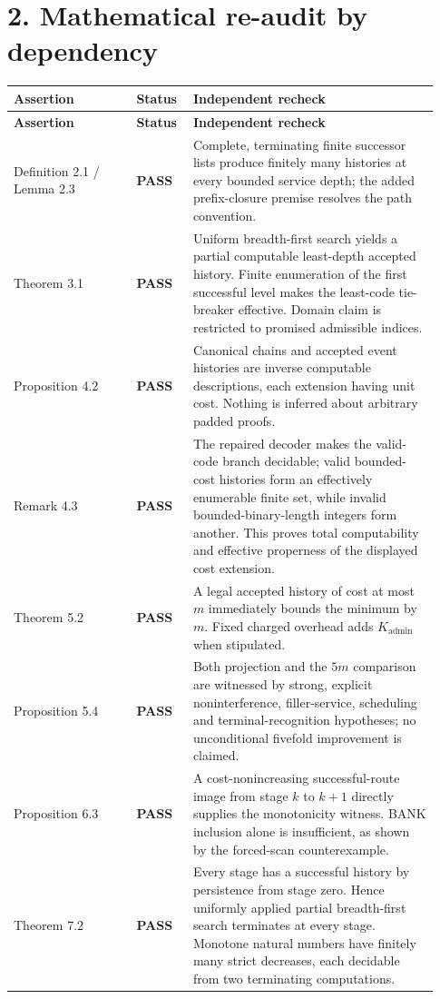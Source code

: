 \documentclass[11pt,letterpaper]{article}
\newcommand{\PASS}{\textbf{PASS}}
\begin{document}
\section*{2. Mathematical re-audit by dependency}
\begin{longtable}{@{}p{0.27\linewidth}p{0.12\linewidth}p{0.54\linewidth}@{}}
\toprule\textbf{Assertion} & \textbf{Status} & \textbf{Independent recheck}\\\midrule
\endfirsthead
\toprule\textbf{Assertion} & \textbf{Status} & \textbf{Independent recheck}\\\midrule
\endhead
Definition 2.1 / Lemma 2.3 & \PASS & Complete, terminating finite successor lists produce finitely many histories at every bounded service depth; the added prefix-closure premise resolves the path convention.\\
Theorem 3.1 & \PASS & Uniform breadth-first search yields a partial computable least-depth accepted history. Finite enumeration of the first successful level makes the least-code tie-breaker effective. Domain claim is restricted to promised admissible indices.\\
Proposition 4.2 & \PASS & Canonical chains and accepted event histories are inverse computable descriptions, each extension having unit cost. Nothing is inferred about arbitrary padded proofs.\\
Remark 4.3 & \PASS & The repaired decoder makes the valid-code branch decidable; valid bounded-cost histories form an effectively enumerable finite set, while invalid bounded-binary-length integers form another. This proves total computability and effective properness of the displayed cost extension.\\
Theorem 5.2 & \PASS & A legal accepted history of cost at most $m$ immediately bounds the minimum by $m$. Fixed charged overhead adds $K_{\mathrm{admin}}$ when stipulated.\\
Proposition 5.4 & \PASS & Both projection and the $5m$ comparison are witnessed by strong, explicit noninterference, filler-service, scheduling and terminal-recognition hypotheses; no unconditional fivefold improvement is claimed.\\
Proposition 6.3 & \PASS & A cost-nonincreasing successful-route image from stage $k$ to $k+1$ directly supplies the monotonicity witness. BANK inclusion alone is insufficient, as shown by the forced-scan counterexample.\\
Theorem 7.2 & \PASS & Every stage has a successful history by persistence from stage zero. Hence uniformly applied partial breadth-first search terminates at every stage. Monotone natural numbers have finitely many strict decreases, each decidable from two terminating computations.\\

\end{longtable}
\end{document}
